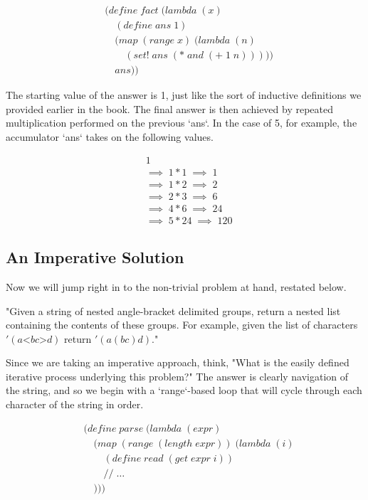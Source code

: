 \begin{align*}
& (define \; fact \; (lambda \; (x)
\\& \quad (define \; ans \; 1)
\\& \quad (map \; (range \; x) \; (lambda \; (n)
\\& \qquad (set! \; ans \; (* \; and \; (+ \; 1 \; n)))))
\\& \quad ans))
\end{align*}

The starting value of the answer is 1, just like the sort of inductive definitions we 
provided earlier in the book. The final answer is then achieved by repeated 
multiplication performed on the previous `ans`. In the case of 5, for example, the 
accumulator `ans` takes on the following values.

\begin{align*}
& 1
\\& \implies \; 1*1 \; \implies \; 1
\\& \implies \; 1*2 \; \implies \; 2
\\& \implies \; 2*3 \; \implies \; 6
\\& \implies \; 4*6 \; \implies \; 24
\\& \implies \; 5*24 \; \implies \; 120
\end{align*}

\subsection{An Imperative Solution}
Now we will jump right in to the non-trivial problem at hand, restated below.

"Given a string of nested angle-bracket delimited groups, return a
nested list containing the contents of these groups. For example,
given the list of characters $'(a \text{<} b c \text{>} d)$ return $'(a (b c) d)$."

Since we are taking an imperative approach, think, "What is the easily defined iterative 
process underlying this problem?" The answer is clearly navigation of the string, and so 
we begin with a `range`-based loop that will cycle through each character of the string 
in order.

\begin{align*}
& (define \; parse \; (lambda \; (expr) \; 
\\& \quad (map \; (range \; (length \; expr)) \; (lambda \; (i)
\\& \qquad (define \; read \; (get \; expr \; i))
\\& \qquad // \; \dots
\\& \quad )))
\end{align*}


